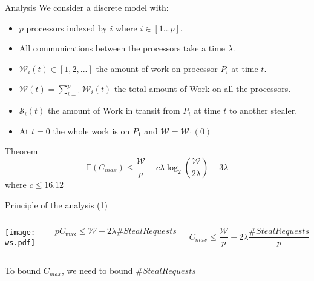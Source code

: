 \documentclass{beamer}
\begin{document}
\begin{frame}{Analysis}
    We consider a discrete model with: 
    \begin{itemize}
        \item $p$ processors indexed by $i$ where  $i \in [1...p]$.
        \item All communications between the processors take a time $\lambda$.
        \item $\mathcal{W}_i(t) \in [1,2,...]$ the amount of work on processor $P_i$ at time $t$.
        \item $\mathcal{W}(t) = \sum_{i=1}^{p} \mathcal{W}_i(t)$ the total amount of Work on all the processors. 
        \item $\mathcal{S}_i(t)$ the amount of Work in transit from $P_i$ at time $t$ to another stealer. 
        \item At $t=0$ the whole work is on $P_1$ and $\mathcal{W} = \mathcal{W}_1(0)$ 
    \end{itemize}
    \bigskip
    
    \begin{block}{Theorem}
        \begin{equation*}   
            \mathbb{E}(C_{max}) \leq \frac{\mathcal{W}}{p} +  c\lambda\log_2(\frac{\mathcal{W}}{2\lambda}) + 3\lambda
        \end{equation*}             where $c \leq 16.12$ 
    \end{block}
\end{frame}

\begin{frame}{Principle of the analysis (1)}
    \begin{columns} 
        \begin{center}
            \texttt{[image: ws.pdf]}
        \end{center}
        \begin{center} 
            $pC_{\max} \le \mathcal{W} + 2\lambda\#\textit{StealRequests}$
        \end{center} 
        \begin{equation}
            C_{max}  \leq \frac{\mathcal{W}}{p} + 2\lambda\frac{\#StealRequests}{p}
        \end{equation} 
    \end{columns} 
    \begin{center}
    To bound \alert{$C_{max}$}, we need to bound \alert{$\#StealRequests$}
    \end{center}
\end{frame}
\end{document}
